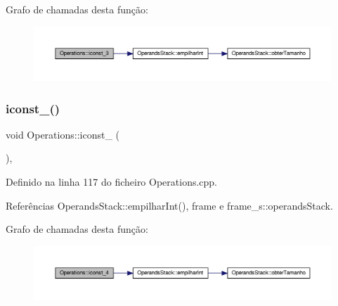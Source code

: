 Grafo de chamadas desta função\+:\nopagebreak
\begin{figure}[H]
\begin{center}
\leavevmode
\includegraphics[width=350pt]{classOperations_ab8466864c000152e75172b623704f610_cgraph}
\end{center}
\end{figure}
\mbox{\label{classOperations_a5fad2dad3d79c889728a6687f36e1192}} 
\subsubsection{\texorpdfstring{iconst\+\_()}{iconst\_4()}}
{\footnotesize\ttfamily void Operations\+::iconst\+\_ (\begin{DoxyParamCaption}{ }\end{DoxyParamCaption})\hspace{0.3cm}{\ttfamily [static]}, {\ttfamily [private]}}



Definido na linha 117 do ficheiro Operations.\+cpp.



Referências Operands\+Stack\+::empilhar\+Int(), frame e frame\+\_\+s\+::operands\+Stack.

Grafo de chamadas desta função\+:\nopagebreak
\begin{figure}[H]
\begin{center}
\leavevmode
\includegraphics[width=350pt]{classOperations_a5fad2dad3d79c889728a6687f36e1192_cgraph}
\end{center}
\end{figure}
\mbox{\label{classOperations_a87a4c7214825d084ded4a8ea50e4af7c}} 
